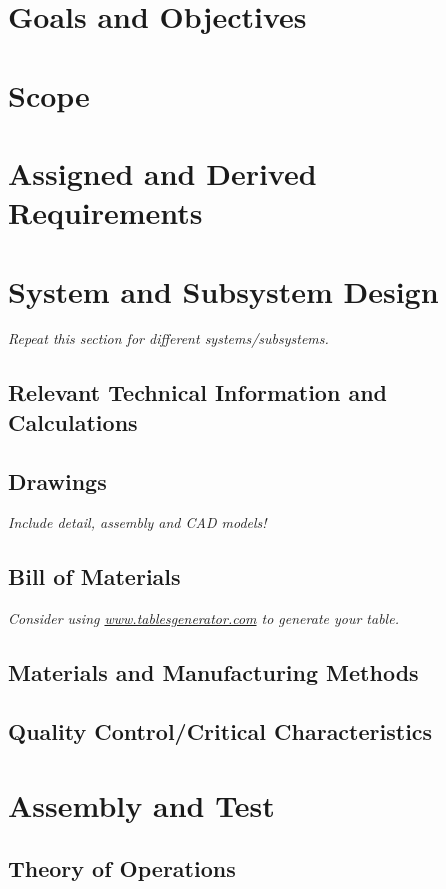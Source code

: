 \documentclass{article}
\begin{document}
\section{Goals and Objectives}

\newpage
\section{Scope}

\newpage
\section{Assigned and Derived Requirements}

\newpage
\section{System and Subsystem Design}
\textit{Repeat this section for different systems/subsystems.}

\subsection{Relevant Technical Information and Calculations}
\subsection{Drawings}
\textit{Include detail, assembly and CAD models!}
\subsection{Bill of Materials}
\textit{Consider using \url{www.tablesgenerator.com} to generate your table.}
\subsection{Materials and Manufacturing Methods}
\subsection{Quality Control/Critical Characteristics}

\newpage
\section{Assembly and Test}

\newpage
\subsection{Theory of Operations}
\end{document}
